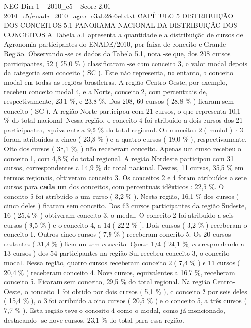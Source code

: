 \begin{textsample}{NEG Dim 1 – 2010\_c5 – Score 2.00 – 2010\_c5/enade\_2010\_agro\_c3ab28c6eb.txt}  \label{ex:f1_neg_303}
CAPÍTULO 5 DISTRIBUIÇÃO DOS CONCEITOS 5.1 PANORAMA NACIONAL DA DISTRIBUIÇÃO DOS CONCEITOS A Tabela 5.1 apresenta a quantidade e a distribuição de cursos de Agronomia participantes do ENADE/2010, por faixa de conceito e Grande Região.
Observando -se os dados da Tabela 5.1, nota -se que, dos 208 cursos participantes, 52 ( 25,0 \% ) classificaram -se com conceito 3, o valor modal depois da categoria sem conceito ( SC ).
Este não representa, no entanto, o conceito modal em todas as regiões brasileiras.
A região Centro-Oeste, por exemplo, recebeu conceito modal 4, e a Norte, conceito 2, com percentuais de, respectivamente, 23,1 \%, e 23,8 \%.
Dos 208, 60 cursos ( 28,8 \% ) ficaram sem conceito ( SC ).
A região Norte participou com 21 cursos, o que representa 10,1 \% do total nacional.
Nessa região, o conceito 4 foi atribuído a dois cursos dos 21 participantes, equivalente a 9,5 \% do total regional.
Os conceitos 2 ( modal ) e 3 foram atribuídos a cinco ( 23,8 \% ) e a quatro cursos ( 19,0 \% ), respectivamente.
Oito dos cursos ( 38,1 \%, ) não receberam conceito.
Apenas um curso recebeu o conceito 1, com 4,8 \% do total regional.
A região Nordeste participou com 31 cursos, correspondentes a 14,9 \% do total nacional.
Destes, 11 cursos, 35,5 \% em termos regionais, obtiveram conceito 3.
Os conceitos 2 e 4 foram atribuídos a sete cursos para \textbf{cada} um dos conceitos, com percentuais idênticos : 22,6 \%.
O conceito 5 foi atribuído a um curso ( 3,2 \% ).
Nesta região, 16,1 \% dos cursos ( cinco deles ) ficaram sem conceito.
Dos 63 cursos participantes da região Sudeste, 16 ( 25,4 \% ) obtiveram conceito 3, o modal.
O conceito 2 foi atribuído a seis cursos ( 9,5 \% ) e o conceito 4, a 14 ( 22,2 \% ).
Dois cursos ( 3,2 \% ) receberam o conceito 1.
Outros cinco cursos ( 7,9 \% ) receberam conceito 5.
Os 20 cursos restantes ( 31,8 \% ) ficaram sem conceito.
Quase 1/4 ( 24,1 \%, correspondendo a 13 cursos ) dos 54 participantes na região Sul recebeu conceito 3, o conceito modal.
Nessa região, quatro cursos receberam conceito 2 ( 7,4 \% ) e 11 cursos ( 20,4 \% ) receberam conceito 4.
Nove cursos, equivalentes a 16,7 \%, receberam conceito 5.
Ficaram sem conceito, 29,5 \% do total regional.
Na região Centro-Oeste, o conceito 1 foi obtido por dois cursos ( 5,1 \% ), o conceito 2 por seis deles ( 15,4 \% ), o 3 foi atribuído a oito cursos ( 20,5 \% ) e o conceito 5, a três cursos ( 7,7 \% ).
Esta região teve o conceito 4 como o modal, como já mencionado, destacando -se nove cursos, 23,1 \% do total para essa região.

\end{textsample}
